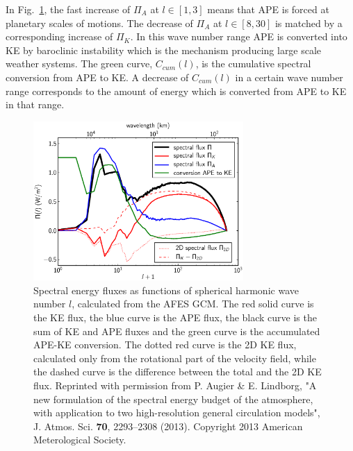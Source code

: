 In Fig.~\ref{Flux}, the fast increase of $ \Pi_A $  at  $ l \in [1, 3] $ means that  APE is forced at planetary scales of motions. The decrease of $ \Pi_A $ at $ l \in [8, 30] $ is matched by a corresponding increase of $ \Pi_K $. In this wave number range APE is converted into KE by baroclinic instability \citep{Vallis:book} which is the mechanism producing large scale weather systems.  The green curve, $ C_{cum}(l) $,  is the cumulative spectral conversion from APE to KE. A decrease of $ C_{cum}(l) $ in a certain wave number range corresponds to the amount of energy which is converted from APE to KE in that range. 

\begin{figure}[h]
\centerline{\includegraphics[angle=0,width=8cm]{./fig1.eps}}
 \caption{Spectral energy fluxes as functions of spherical harmonic wave number $ l $, calculated from the AFES GCM. The red solid curve is the KE flux, the blue curve is the APE flux, the black curve is the sum of KE and APE fluxes and the green curve is the accumulated APE-KE conversion. The dotted red curve is the 2D KE flux, calculated only from the rotational part of the velocity field, while the dashed curve is the difference between the total and the 2D KE flux. 
Reprinted
with permission from P. Augier \& E. Lindborg, 
"A new formulation of the spectral energy budget of the atmosphere, with application to two high-resolution general circulation models", 
J. Atmos. Sci. \textbf{70}, 2293--2308 (2013).
Copyright 2013 American Meterological Society.
}
 \label{Flux}
 \end{figure}


